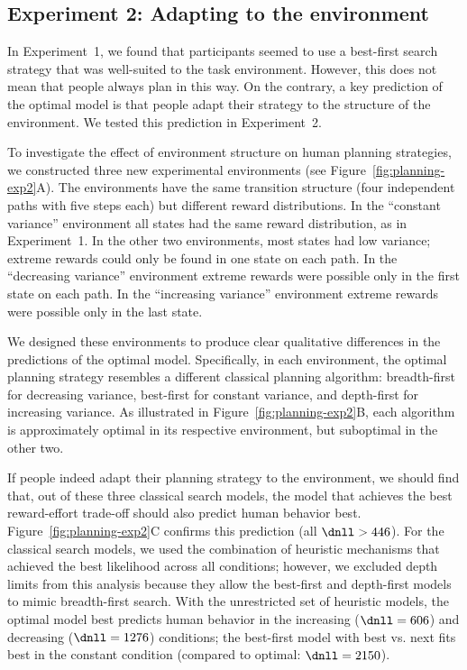 \subsection{Experiment 2: Adapting to the environment}\label{sec:planning-results2}
In Experiment~1, we found that participants seemed to use a best-first search strategy that was well-suited to the task environment. However, this does not mean that people always plan in this way. 
On the contrary, a key prediction of the optimal model is that people adapt their strategy to the structure of the environment. We tested this prediction in Experiment~2.

To investigate the effect of environment structure on human planning strategies, we constructed three new experimental environments (see Figure~\ref{fig:planning-exp2}A). The environments have the same transition structure (four independent paths with five steps each) but different reward distributions. In the ``constant variance'' environment all states had the same reward distribution, as in Experiment~1. In the other two environments, most states had low variance; extreme rewards could only be found in one state on each path. In the ``decreasing variance'' environment extreme rewards were possible only in the first state on each path. In the ``increasing variance'' environment extreme rewards were possible only in the last state.

We designed these environments to produce clear qualitative differences in the predictions of the optimal model. Specifically, in each environment, the optimal planning strategy resembles a different classical planning algorithm: breadth-first for decreasing variance, best-first for constant variance, and depth-first for increasing variance. As illustrated in Figure~\ref{fig:planning-exp2}B, each algorithm is approximately optimal in its respective environment, but suboptimal in the other two.

If people indeed adapt their planning strategy to the environment, we should find that, out of these three classical search models, the model that achieves the best reward-effort trade-off should also predict human behavior best. Figure~\ref{fig:planning-exp2}C confirms this prediction (all $\dnll > 446$). For the classical search models, we used the combination of heuristic mechanisms that achieved the best likelihood across all conditions; however, we excluded depth limits from this analysis because they allow the best-first and depth-first models to mimic breadth-first search. With the unrestricted set of heuristic models, the optimal model best predicts human behavior in the increasing ($\dnll = 606$) and decreasing ($\dnll = 1276$) conditions; the best-first model with best vs. next fits best in the constant condition (compared to optimal: $\dnll = 2150$).


